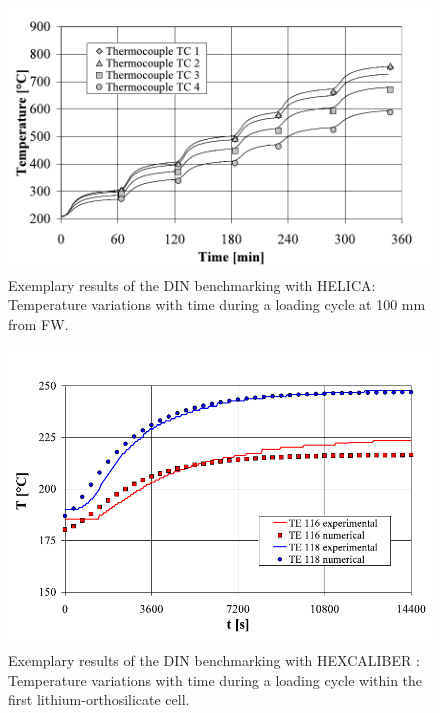 \begin{figure}[t!]
\centering
\includegraphics[width=\singleimagewidth]{figures/Fig-8}
\caption{Exemplary results of the DIN benchmarking with HELICA: Temperature variations with time during a loading cycle at 100 mm from FW\cite{DellOrco:2007hc}.}
\label{fig:DIN_HELICA}
\end{figure}


 \begin{figure}[t!]
\centering
\includegraphics[width=\singleimagewidth]{figures/Fig-9}
\caption{Exemplary results of the DIN benchmarking with HEXCALIBER : Temperature variations with time during a loading cycle within the first lithium-orthosilicate cell\cite{DellOrco:2010zr}.}
\label{fig:DIN_HEX}
\end{figure}





%
%
